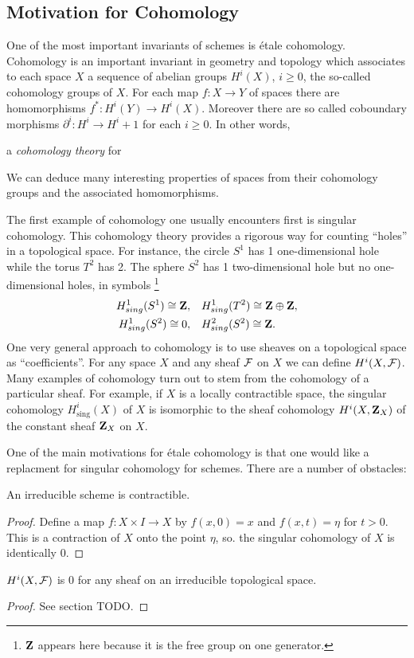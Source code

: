 \subsection{Motivation for Cohomology}
One of the most important invariants of schemes is \'etale cohomology.  Cohomology is an important invariant in geometry and topology which associates to each space $X$ a sequence of abelian groups $H^i(X)$, $i \ge 0$, the so-called cohomology groups of $X$. For each map $f: X \to Y$ of spaces there are homomorphisms $f^*: H^i(Y) \to H^i(X)$. Moreover there are so called coboundary morphisms $\partial^i : H^i \to H^i+1$ for each $i \ge 0$. In other words, 
\begin{definition}
    a \textit{cohomology theory} for
\end{definition}
We can deduce many interesting properties of spaces from their cohomology groups and the associated homomorphisms.

The first example of cohomology one usually encounters first is singular cohomology. This cohomology theory provides a rigorous way for counting ``holes'' in a topological space.  For instance, the circle $S^1$ has 1 one-dimensional hole while the torus $T^2$ has 2. The sphere $S^2$ has 1 two-dimensional hole but no one-dimensional holes, in symbols 
\footnote{$\mathbf{Z}$ appears here because it is the free group on one generator.}
\begin{align*}
  H^1_{sing}(S^1) \cong \mathbf{Z},\quad &H^1_{sing}(T^2) \cong \mathbf{Z} \oplus \mathbf{Z},\\
  H^1_{sing}(S^2) \cong  0,\quad &H^2_{sing}(S^2) \cong \mathbf{Z}.
\end{align*}
One very general approach to cohomology is to use sheaves on a topological space as ``coefficients''. For any space $X$ and any sheaf $\mathcal{F}$ on $X$ we can define $H^i(X, \mathcal{F})$. Many examples of cohomology turn out to stem from the cohomology of a particular sheaf. For example, if $X$ is a locally contractible space, the singular cohomology $H_{\text{sing}}^i(X)$ of $X$ is isomorphic to the sheaf cohomology $H^i(X, \mathbf{Z}_X)$ of the constant sheaf $\mathbf{Z}_X$ on $X$.

One of the main motivations for \'etale cohomology is that one would like a replacment for singular cohomology for schemes. There are a number of obstacles:
\begin{proposition}\label{scheme_contractible}
    An irreducible scheme is contractible.
\end{proposition}
\begin{proof}
  Define a map $f: X \times I \to X$  by $f(x,0) = x$ and $f(x,t) = \eta$ for $t > 0$. This is a contraction of $X$ onto the point $\eta$, so. the singular cohomology of $X$ is identically 0.
\end{proof}
\begin{proposition}
  $H^i(X, \mathcal{F})$ is 0 for any sheaf on an irreducible topological space.
\end{proposition}
\begin{proof}
    See section TODO.
\end{proof}

